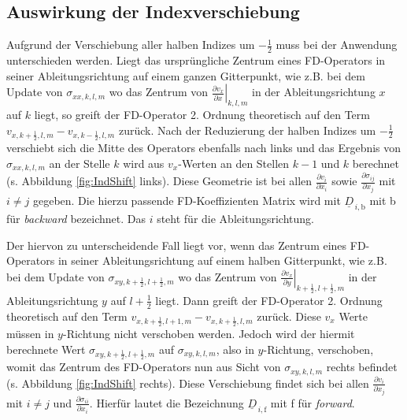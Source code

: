 \documentclass[pdftex,a4paper,parskip,listof=totoc,bibliography=totoc,onehalfspacing,12pt]{scrreprt}
\begin{document}
\subsection{Auswirkung der Indexverschiebung}
Aufgrund der Verschiebung aller halben Indizes um $-\frac{1}{2}$ muss bei der Anwendung unterschieden werden. Liegt das ursprüngliche Zentrum eines FD-Operators in seiner Ableitungsrichtung auf einem ganzen Gitterpunkt, wie z.B. bei dem Update von $\sigma_{xx,k,l,m}$ wo das Zentrum von $\left. \frac{\partial v_x}{\partial x} \right\rvert_{k,l,m}$ in der Ableitungsrichtung $x$ auf $k$ liegt, so greift der FD-Operator 2. Ordnung theoretisch auf den Term $v_{x,k+\frac{1}{2},l,m} - v_{x,k-\frac{1}{2},l,m}$ zurück. Nach der Reduzierung der halben Indizes um $-\frac{1}{2}$ verschiebt sich die Mitte des Operators ebenfalls nach links und das Ergebnis von $\sigma_{xx,k,l,m}$ an der Stelle $k$ wird aus $v_x$-Werten an den Stellen $k-1$ und $k$ berechnet (s. Abbildung \ref{fig:IndShift} links). Diese Geometrie ist bei allen $\frac{\partial v_i}{\partial x_i}$ sowie $\frac{\partial \sigma_{ij}}{\partial x_j}$ mit $i\neq j$ gegeben. Die hierzu passende FD-Koeffizienten Matrix wird mit $\underline{D}_{\,i,\mathrm{b}}$ mit b für \textit{backward} bezeichnet. Das $i$ steht für die Ableitungsrichtung.

Der hiervon zu unterscheidende Fall liegt vor, wenn das Zentrum eines FD-Operators in seiner Ableitungsrichtung auf einem halben Gitterpunkt, wie z.B. bei dem Update von $\sigma_{xy,k+\frac{1}{2},l+\frac{1}{2},m}$ wo das Zentrum von $\left. \frac{\partial v_x}{\partial y} \right\rvert_{k+\frac{1}{2},l+\frac{1}{2},m}$ in der Ableitungsrichtung $y$ auf $l+\frac{1}{2}$ liegt. Dann greift der FD-Operator 2. Ordnung theoretisch auf den Term $v_{x,k+\frac{1}{2},l+1,m} - v_{x,k+\frac{1}{2},l,m}$ zurück. Diese $v_x$ Werte müssen in $y$-Richtung nicht verschoben werden. Jedoch wird der hiermit berechnete Wert $\sigma_{xy,k+\frac{1}{2},l+\frac{1}{2},m}$ auf $\sigma_{xy,k,l,m}$, also in $y$-Richtung, verschoben, womit das Zentrum des FD-Operators nun aus Sicht von $\sigma_{xy,k,l,m}$ rechts befindet (s. Abbildung \ref{fig:IndShift} rechts). Diese Verschiebung findet sich bei allen $\frac{\partial v_i}{\partial x_j}$ mit $i\neq j$ und $\frac{\partial \sigma_{ii}}{\partial x_i}$. Hierfür lautet die Bezeichnung $\underline{D}_{\,i,\mathrm{f}}$ mit f für \textit{forward}.
\end{document}
